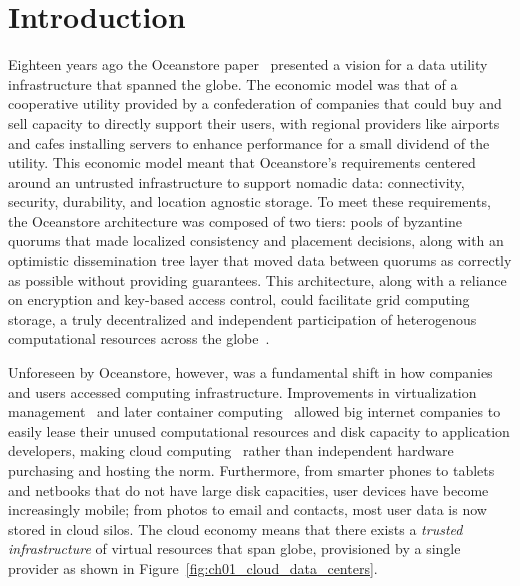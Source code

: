 
\renewcommand{\thechapter}{1}

\chapter{Introduction}

Eighteen years ago the Oceanstore paper~\cite{oceanstore} presented a vision for a data utility infrastructure that spanned the globe.
The economic model was that of a cooperative utility provided by a confederation of companies that could buy and sell capacity to directly support their users, with regional providers like airports and cafes installing servers to enhance performance for a small dividend of the utility.
This economic model meant that Oceanstore's requirements centered around an untrusted infrastructure to support nomadic data: connectivity, security, durability, and location agnostic storage.
To meet these requirements, the Oceanstore architecture was composed of two tiers: pools of byzantine quorums that made localized consistency and placement decisions, along with an optimistic dissemination tree layer that moved data between quorums as correctly as possible without providing guarantees.
This architecture, along with a reliance on encryption and key-based access control, could facilitate grid computing storage, a truly decentralized and independent participation of heterogenous computational resources across the globe~\cite{grid_computing}.

Unforeseen by Oceanstore, however, was a fundamental shift in how companies and users accessed computing infrastructure.
Improvements in virtualization management~\cite{eucalyptus} and later container computing~\cite{docker} allowed big internet companies to easily lease their unused computational resources and disk capacity to application developers, making cloud computing~\cite{cloud_computing} rather than independent hardware purchasing and hosting the norm.
Furthermore, from smarter phones to tablets and netbooks that do not have large disk capacities, user devices have become increasingly mobile; from photos to email and contacts, most user data is now stored in cloud silos.
The cloud economy means that there exists a \emph{trusted infrastructure} of virtual resources that span globe, provisioned by a single provider as shown in Figure~\ref{fig:ch01_cloud_data_centers}.

